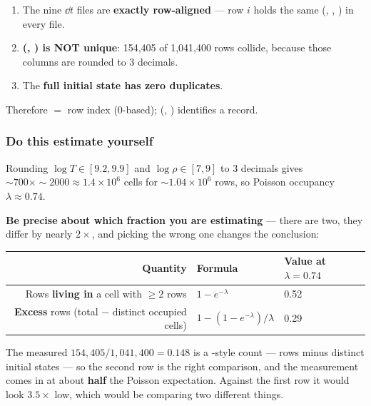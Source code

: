 \begin{enumerate}
\item The nine $\dd t$ files are \textbf{exactly row-aligned} --- row $i$ holds
      the same (, , ) in every file.
\item \textbf{(, ) is NOT unique}: 154,405 of 1,041,400
      rows collide, because those columns are rounded to 3 decimals.
\item The \textbf{full initial state has zero duplicates}.
\end{enumerate}

Therefore  $=$ row index (0-based);
(, ) identifies a record.

\subsubsection{Do this estimate yourself}
\label{sec:collisionestimate}

Rounding $\log T \in [9.2, 9.9]$ and $\log\rho \in [7, 9]$ to 3 decimals gives
${\sim}700 \times {\sim}2000 \approx 1.4\times10^{6}$ cells for
${\sim}1.04\times10^{6}$ rows, so Poisson occupancy $\lambda \approx 0.74$.

\textbf{Be precise about which fraction you are estimating} --- there are two,
they differ by nearly $2\times$, and picking the wrong one changes the
conclusion:

\begin{center}
\small
\begin{tabularx}{\textwidth}{@{}R{1.000} l l@{}}
\toprule
\textbf{Quantity} & \textbf{Formula} &
\textbf{Value at $\lambda = 0.74$} \\
\midrule
Rows \textbf{living in} a cell with $\geq2$ rows & $1 - e^{-\lambda}$ & 0.52 \\
\textbf{Excess} rows (total $-$ distinct occupied cells) &
  $1 - (1-e^{-\lambda})/\lambda$ & 0.29 \\
\bottomrule
\end{tabularx}
\end{center}

The measured $154{,}405 / 1{,}041{,}400 = \mathbf{0.148}$ is a
-style count --- rows minus distinct initial states --- so the
second row is the right comparison, and the measurement comes in at about
\textbf{half} the Poisson expectation. Against the first row it would look
$3.5\times$ low, which would be comparing two different things.

